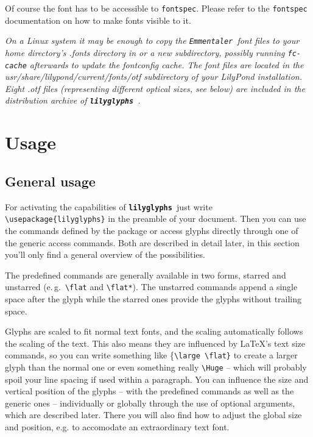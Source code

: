 \documentclass{article}
\newcommand*{\lilyglyphs}{\texttt{\textbf{lilyglyphs\,}}}
\newcommand*{\emmentaler}{\texttt{\textit{Emmentaler }}}
\newcommand*{\cmd}[1]{\texttt{\textbackslash #1}}
\begin{document}
Of course the font has to be accessible to \texttt{fontspec}. 
Please refer to the \texttt{fontspec} documentation on how to make fonts visible to it. 

\textit{On a Linux system it may be enough to copy the \emmentaler font files to your home directory's .fonts directory in or a new subdirectory, possibly running \texttt{fc-cache} afterwards to update the fontconfig cache. 
The font files are located in the usr/share/lilypond/current/fonts/otf subdirectory of your LilyPond installation. 
Eight .otf files (representing different optical sizes, see below) are included in the distribution archive of \lilyglyphs.}



\section{Usage}
\subsection{General usage}
For activating the capabilities of \lilyglyphs just write \cmd{usepackage\{lilyglyphs\}} in the preamble of your document. 
Then you can use the commands defined by the package or access glyphs directly through one of the generic access commands.
Both are described in detail later, in this section you'll only find a general overview of the possibilities.

The predefined commands are generally available in two forms, starred and unstarred (e.\,g.\ \cmd{flat} and \cmd{flat*}). 
The unstarred commands append a single space after the glyph while the starred ones provide the glyphs without trailing space. 

Glyphs are scaled to fit normal text fonts, and the scaling automatically follows the scaling of the text. 
This also means they are influenced by \LaTeX 's text size commands, so you can write something like \{\cmd{large \textbackslash flat\}} to create a larger {\large \flat}glyph than the normal \flat one or even something really \cmd{Huge} {\Huge {}} -- which will probably spoil your line spacing if used within a paragraph. 
You can influence the size and vertical position of the glyphs -- with the predefined commands as well as the generic ones -- individually or globally through the use of optional arguments, which are described later.
There you will also find how to adjust the global size and position, e.g. to accomodate an extraordinary text font.
\end{document}
